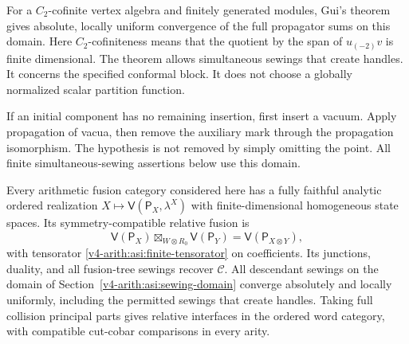 For a \(C_2\)-cofinite vertex algebra and finitely generated modules,
Gui's theorem gives absolute, locally uniform
convergence of the full propagator sums on this domain.
Here \(C_2\)-cofiniteness means that the quotient by the span of
\(u_{(-2)}v\) is finite dimensional.
The theorem allows simultaneous sewings that create handles.
It concerns the specified conformal block. It does not choose a
globally normalized scalar partition function.

If an initial component has no remaining insertion, first insert
a vacuum. Apply propagation of vacua, then remove the auxiliary
mark through the propagation isomorphism.
The hypothesis is not removed by simply omitting the point.
All finite simultaneous-sewing assertions below use this domain.

\begin{theorem}\label{v4-arith:asi:finite-analytic-realization}
Every arithmetic fusion category considered here has a fully faithful
analytic ordered realization
$X\mapsto\mathsf V(\mathsf P_X,\lambda^X)$ with finite-dimensional
homogeneous state spaces. Its symmetry-compatible relative fusion is
\[
 \mathsf V(\mathsf P_X)\boxtimes_{W\otimes R_0}
 \mathsf V(\mathsf P_Y)
       =\mathsf V(\mathsf P_{X\otimes Y}),
\]
with tensorator \eqref{v4-arith:asi:finite-tensorator} on coefficients.
Its junctions, duality, and all fusion-tree sewings recover $\mathcal C$.
All descendant sewings on the domain of
Section~\ref{v4-arith:asi:sewing-domain} converge absolutely and locally
uniformly, including the permitted sewings that create handles.
Taking full collision principal parts gives relative interfaces in the
ordered word category, with compatible cut-cobar comparisons in every arity.
\end{theorem}
